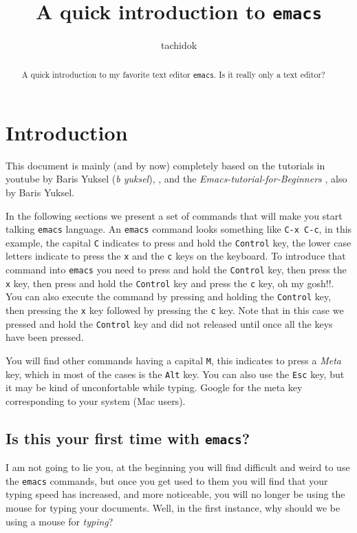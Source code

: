 \documentclass[12pt,a4paper,final]{article} %
\author{tachidok}
\title{A quick introduction to \texttt{emacs}}
\date{}
\begin{document}
\maketitle

\begin{abstract}
  A quick introduction to my favorite text editor \texttt{emacs}. Is
  it really only a text editor?
\end{abstract}



\section{Introduction}
This document is mainly (and by now) completely based on the tutorials
in youtube by Baris Yuksel (\textit{b yuksel}),
\cite{emacs_video_01:URL, emacs_video_02:URL}, and the
\textit{Emacs-tutorial-for-Beginners} \cite{emacs_github:URL}, also by
Baris Yuksel.

In the following sections we present a set of commands that will make
you start talking \texttt{emacs} language. An \texttt{emacs} command
looks something like \texttt{C-x C-c}, in this example, the capital
\texttt{C} indicates to press and hold the \texttt{Control} key, the
lower case letters indicate to press the \texttt{x} and the \texttt{c}
keys on the keyboard. To introduce that command into \texttt{emacs}
you need to press and hold the \texttt{Control} key, then press the
\texttt{x} key, then press and hold the \texttt{Control} key and press
the \texttt{c} key, oh my gosh!!. You can also execute the command by
pressing and holding the \texttt{Control} key, then pressing the
\texttt{x} key followed by pressing the \texttt{c} key. Note that in
this case we pressed and hold the \texttt{Control} key and did not
released until once all the keys have been pressed.

You will find other commands having a capital \texttt{M}, this
indicates to press a \textit{Meta} key, which in most of the cases is
the \texttt{Alt} key. You can also use the \texttt{Esc} key, but it
may be kind of unconfortable while typing. Google for the meta key
corresponding to your system (Mac users).

\subsection{Is this your first time with \texttt{emacs}?}
I am not going to lie you, at the beginning you will find difficult
and weird to use the \texttt{emacs} commands, but once you get used to
them you will find that your typing speed has increased, and more
noticeable, you will no longer be using the mouse for typing your
documents. Well, in the first instance, why should we be using a mouse
for \textit{typing}?
\end{document}
